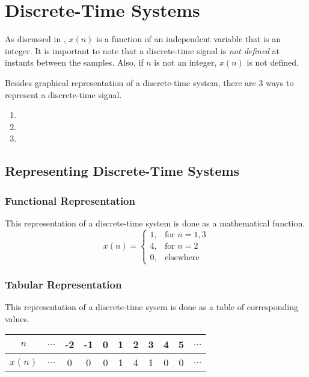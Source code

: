 \section{Discrete-Time Systems}\label{sec:Discrete-Time Systems}
As discussed in , $x(n)$ is a function of an independent variable that is an integer.
It is important to note that a discrete-time signal is \emph{not defined} at instants between the samples.
Also, if $n$ is not an integer, $x(n)$ is not defined.

Besides graphical representation of a discrete-time system, there are 3 ways to represent a discrete-time signal.
\begin{enumerate}[noitemsep]
\item {}
\item {}
\item {}
\end{enumerate}

\subsection{Representing Discrete-Time Systems}\label{subsec:Representing Discrete-Time Systems}
\subsubsection{Functional Representation}\label{subsubsec:Functional Representation}
This representation of a discrete-time system is done as a mathematical function.
\begin{equation}\label{eq:Functional Representation}
  x(n) = \begin{cases}
    1 ,& \text{for } n = 1,3 \\
    4 ,& \text{for } n = 2 \\
    0 ,& \text{elsewhere}
  \end{cases}
\end{equation}

\subsubsection{Tabular Representation}\label{subsubsec:Tabular Representation}
This representation of a discrete-time sysem is done as a table of corresponding values.
\begin{table}[h!]
  \centering
  \begin{tabular}{c|cccccccccc}
    $n$ & $\ldots$ & -2 & -1 & 0 & 1 & 2 & 3 & 4 & 5 & $\ldots$ \\ \midrule
    $x(n)$ & $\ldots$ & 0 & 0 & 0 & 1 & 4 & 1 & 0 & 0 & $\ldots$
  \end{tabular}
\end{table}

